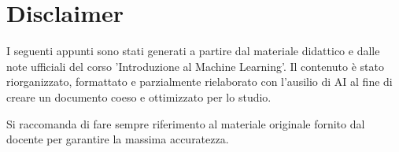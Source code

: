\documentclass{article}
\begin{document}
\maketitle

\tableofcontents

\section*{Disclaimer}
\vfill
\begin{nota*}{}
I seguenti appunti sono stati generati a partire dal materiale
didattico e dalle note ufficiali del corso 'Introduzione al Machine Learning'.
Il contenuto è stato riorganizzato, formattato e parzialmente rielaborato con
l'ausilio di AI al fine di creare un documento coeso e ottimizzato per lo studio.

\medskip

Si raccomanda di fare sempre riferimento al materiale originale fornito dal
docente per garantire la massima accuratezza.
\end{nota*}
\vfill











\end{document}
